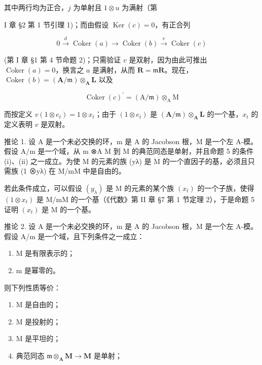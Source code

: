 其中两行均为正合，\(j\) 为单射且 \(1 \otimes u\) 为满射（第

I 章 §2 第 1 节引理 1)；而由假设 \(\operatorname{Ker}(c) = 0\)，有正合列

\[
0 \xrightarrow {d} \operatorname{Coker} (a) \longrightarrow \operatorname{Coker} (b) \xrightarrow {v} \operatorname{Coker} (c)
\]

(第 I 章 §1 第 4 节命题 2)；只需验证 \(v\) 是双射，因为由此可推出 \(\operatorname{Coker}(a) = 0\)，换言之 \(a\) 是满射，从而 \(\mathbf{R} = \mathfrak{m}\mathbf{R}\)。现在，\(\operatorname{Coker}(b) = (\mathbf{A}/\mathfrak{m}) \otimes_{\mathbf{A}} \mathbf{L}\) 以及

\[
\operatorname{Coker} (c) ^{\prime} = (\mathrm{A} / \mathfrak {m}) \otimes_ {\mathrm{A}} \mathrm{M}
\]

而按定义 \(v(1 \otimes e_t) = 1 \otimes x_t\)；由于 \((1 \otimes e_t)\) 是 \((\mathbf{A} / \mathfrak{m}) \otimes_{\mathbf{A}} \mathbf{L}\) 的一个基，\(x_t\) 的定义表明 \(v\) 是双射。

推论 1. 设 A 是一个未必交换的环，m 是 A 的 Jacobson 根，M 是一个左 A-模。假设 A/m 是一个域，从 m ⊗A M 到 M 的典范同态是单射，并且命题 5 的条件 (i)、(ii) 之一成立。为使 M 的元素的族 (yλ) 是 M 的一个直因子的基，必须且只需族 (1 ⊗yλ) 在 M/mM 中是自由的。

若此条件成立，可以假设 \((y_{\lambda})\) 是 M 的元素的某个族 \((x_{t})\) 的一个子族，使得 \((1 \otimes x_{t})\) 是 M/mM 的一个基（《代数》第 II 章 §7 第 1 节定理 2），于是命题 5 证明 \((x_{t})\) 是 M 的一个基。

推论 2. 设 A 是一个未必交换的环，m 是 A 的 Jacobson 根，M 是一个左 A-模。假设 A/m 是一个域，且下列条件之一成立：

\begin{enumerate}
\def\labelenumi{(\roman{enumi})}
\item
  M 是有限表示的；
\item
  m 是幂零的。
\end{enumerate}

则下列性质等价：

\begin{enumerate}
\def\labelenumi{(\alph{enumi})}
\item
  M 是自由的；
\item
  M 是投射的；
\item
  M 是平坦的；
\item
  典范同态 \(\mathfrak{m} \otimes_{\mathbf{A}} \mathbf{M} \to \mathbf{M}\) 是单射；
\end{enumerate}

